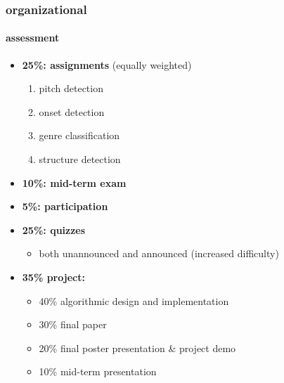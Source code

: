         \begin{frame}\frametitle{organizational}\framesubtitle{assessment}
            \begin{itemize}
                \item	\textbf{25\%: assignments} (equally weighted)
                        \begin{enumerate}
                            \item	pitch detection
                            \item   onset detection
                            \item   genre classification
                            \item   structure detection
                        \end{enumerate}

                \smallskip
                \item   \textbf{10\%: mid-term exam}

                \smallskip
                \item   \textbf{5\%: participation}

                \smallskip
                \item   \textbf{25\%: quizzes}
                    \begin{itemize}
                        \item   both unannounced and announced (increased difficulty)
                    \end{itemize}
                
                \smallskip
                \item   \textbf{35\% project: }
                     \begin{itemize}
                        \item   40\% algorithmic design and implementation
                        \item   30\% final paper
                        \item   20\% final poster presentation \& project demo
                        \item   10\% mid-term presentation 
                    \end{itemize}
            \end{itemize}
        \end{frame}

